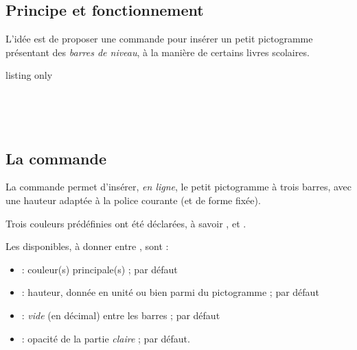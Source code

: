 \documentclass[french,11pt,a4paper]{article}
\begin{document}
\subsection{Principe et fonctionnement}

L'idée est de proposer une commande pour insérer un petit pictogramme présentant des \textit{barres de niveau}, à la manière de certains livres scolaires.

\begin{DemoCode}{listing only}
\end{DemoCode}

\begin{DemoCode}{}
~~~
\end{DemoCode}

\begin{DemoCode}{}
\pictoskillsgreen~\pictoskillsorange~\pictoskillsred
\end{DemoCode}

\subsection{La commande}

La commande permet d'insérer, \textit{en ligne}, le petit pictogramme à trois barres, avec une hauteur adaptée à la police courante (et de forme fixée).

Trois couleurs prédéfinies ont été déclarées, à savoir ,  et .

\smallskip

Les  disponibles, à donner entre \MontreCode{[...]}, sont :

\begin{itemize}
	\item {} : couleur(s) principale(s) ;  par défaut
	\item {} : hauteur, donnée en unité ou bien parmi  du pictogramme ;  par défaut
	\item {} : \textit{vide} (en décimal) entre les barres ;  par défaut
	\item {} : opacité de la partie \textit{claire} ;   par défaut.
\end{itemize}
\end{document}
